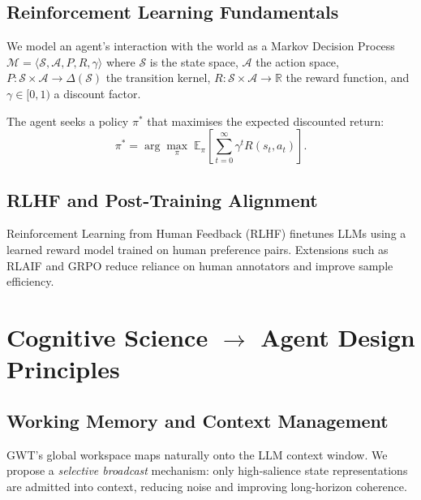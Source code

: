 \documentclass[12pt,a4paper]{article}
\begin{document}
\subsection{Reinforcement Learning Fundamentals}

We model an agent's interaction with the world as a Markov Decision Process
$\mathcal{M} = \langle \mathcal{S}, \mathcal{A}, P, R, \gamma \rangle$ where
$\mathcal{S}$ is the state space, $\mathcal{A}$ the action space,
$P: \mathcal{S} \times \mathcal{A} \to \Delta(\mathcal{S})$ the transition kernel,
$R: \mathcal{S} \times \mathcal{A} \to \mathbb{R}$ the reward function, and
$\gamma \in [0,1)$ a discount factor.

The agent seeks a policy $\pi^*$ that maximises the expected discounted return:
\begin{equation}
  \pi^* = \arg\max_\pi \; \mathbb{E}_\pi \left[ \sum_{t=0}^{\infty} \gamma^t R(s_t, a_t) \right].
\end{equation}

\subsection{RLHF and Post-Training Alignment}

Reinforcement Learning from Human Feedback (RLHF) \citep{christiano2017deep} finetunes LLMs
using a learned reward model trained on human preference pairs. Extensions such as
RLAIF \citep{bai2022constitutional} and GRPO \citep{shao2024deepseekmath} reduce reliance on
human annotators and improve sample efficiency.

\section{Cognitive Science $\rightarrow$ Agent Design Principles}

\subsection{Working Memory and Context Management}

GWT's global workspace maps naturally onto the LLM context window. We propose a
\emph{selective broadcast} mechanism: only high-salience state representations are
admitted into context, reducing noise and improving long-horizon coherence.
\end{document}

